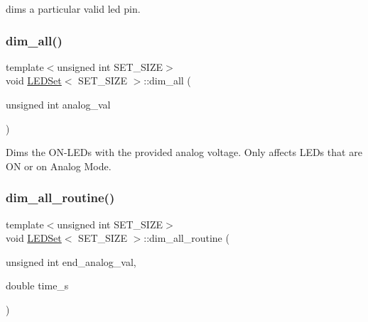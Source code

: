 dims a particular valid led pin. 

\mbox{\label{classLEDSet_ad8313aa0c4fc34cd3481db0fade6318c}} 
\subsubsection{\texorpdfstring{dim\+\_\+all()}{dim\_all()}}
{\footnotesize\ttfamily template$<$unsigned int S\+E\+T\+\_\+\+S\+I\+ZE$>$ \\
void \hyperlink{classLEDSet}{L\+E\+D\+Set}$<$ S\+E\+T\+\_\+\+S\+I\+ZE $>$\+::dim\+\_\+all (\begin{DoxyParamCaption}\item[{unsigned int}]{analog\+\_\+val }\end{DoxyParamCaption})\hspace{0.3cm}{\ttfamily [inline]}}



Dims the O\+N-\/\+L\+E\+Ds with the provided analog voltage. Only affects L\+E\+Ds that are ON or on Analog Mode. 

\mbox{\label{classLEDSet_a30c6efe7fc286c3d0a7e2ac210dd2c1e}} 
\subsubsection{\texorpdfstring{dim\+\_\+all\+\_\+routine()}{dim\_all\_routine()}}
{\footnotesize\ttfamily template$<$unsigned int S\+E\+T\+\_\+\+S\+I\+ZE$>$ \\
void \hyperlink{classLEDSet}{L\+E\+D\+Set}$<$ S\+E\+T\+\_\+\+S\+I\+ZE $>$\+::dim\+\_\+all\+\_\+routine (\begin{DoxyParamCaption}\item[{unsigned int}]{end\+\_\+analog\+\_\+val,  }\item[{double}]{time\+\_\+s }\end{DoxyParamCaption})\hspace{0.3cm}{\ttfamily [inline]}}

\mbox{\label{classLEDSet_aa392b74b090de60a25f7577195327afd}} 
